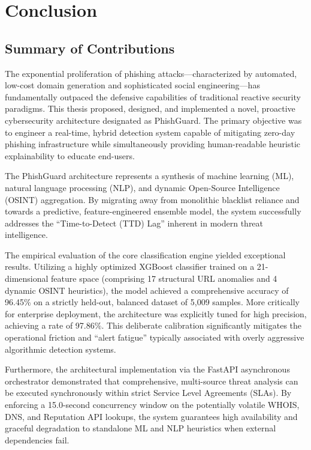 \section{Conclusion}

\subsection{Summary of Contributions}\label{summary-of-contributions}

The exponential proliferation of phishing attacks---characterized by
automated, low-cost domain generation and sophisticated social
engineering---has fundamentally outpaced the defensive capabilities of
traditional reactive security paradigms. This thesis proposed, designed,
and implemented a novel, proactive cybersecurity architecture designated
as PhishGuard. The primary objective was to engineer a real-time, hybrid
detection system capable of mitigating zero-day phishing infrastructure
while simultaneously providing human-readable heuristic explainability
to educate end-users.

The PhishGuard architecture represents a synthesis of machine learning
(ML), natural language processing (NLP), and dynamic Open-Source
Intelligence (OSINT) aggregation. By migrating away from monolithic
blacklist reliance and towards a predictive, feature-engineered ensemble
model, the system successfully addresses the ``Time-to-Detect (TTD)
Lag'' inherent in modern threat intelligence.

The empirical evaluation of the core classification engine yielded
exceptional results. Utilizing a highly optimized XGBoost classifier
trained on a 21-dimensional feature space (comprising 17 structural URL
anomalies and 4 dynamic OSINT heuristics), the model achieved a
comprehensive accuracy of 96.45\% on a strictly held-out, balanced
dataset of 5,009 samples. More critically for enterprise deployment, the
architecture was explicitly tuned for high precision, achieving a rate
of 97.86\%. This deliberate calibration significantly mitigates the
operational friction and ``alert fatigue'' typically associated with
overly aggressive algorithmic detection systems.

Furthermore, the architectural implementation via the FastAPI
asynchronous orchestrator demonstrated that comprehensive, multi-source
threat analysis can be executed synchronously within strict Service
Level Agreements (SLAs). By enforcing a 15.0-second concurrency window
on the potentially volatile WHOIS, DNS, and Reputation API lookups, the
system guarantees high availability and graceful degradation to
standalone ML and NLP heuristics when external dependencies fail.

